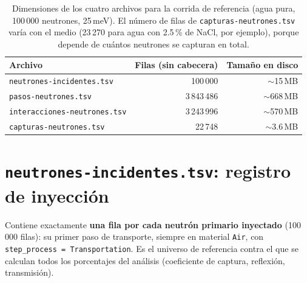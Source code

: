 \documentclass[11pt,a4paper]{article}
\newcommand{\archivo}[1]{\texttt{#1}} %
\newcommand{\var}[1]{\texttt{#1}}
\begin{document}
\begin{table}[H]
\centering
\begin{tabularx}{\linewidth}{X r r}
\toprule
\textbf{Archivo} & \textbf{Filas (sin cabecera)} & \textbf{Tamaño en disco} \\
\midrule
\archivo{neutrones-incidentes.tsv} & 100\,000 & $\sim$15\,MB \\
\archivo{pasos-neutrones.tsv} & 3\,843\,486 & $\sim$668\,MB \\
\archivo{interacciones-neutrones.tsv} & 3\,243\,996 & $\sim$570\,MB \\
\archivo{capturas-neutrones.tsv} & 22\,748 & $\sim$3.6\,MB \\
\bottomrule
\end{tabularx}
\caption{Dimensiones de los cuatro archivos para la corrida de referencia (agua pura, 100\,000
neutrones, 25\,meV). El número de filas de \archivo{capturas-neutrones.tsv} varía con el medio
(23\,270 para agua con 2.5\,\% de NaCl, por ejemplo), porque depende de cuántos neutrones se
capturan en total.}
\label{tab:tamanos}
\end{table}

\section{\archivo{neutrones-incidentes.tsv}: registro de inyección}

Contiene exactamente \textbf{una fila por cada neutrón primario inyectado} (100\,000 filas): su
primer paso de transporte, siempre en material \var{Air}, con \var{step\_process =
Transportation}. Es el universo de referencia contra el que se calculan todos los porcentajes del
análisis (coeficiente de captura, reflexión, transmisión).
\end{document}
